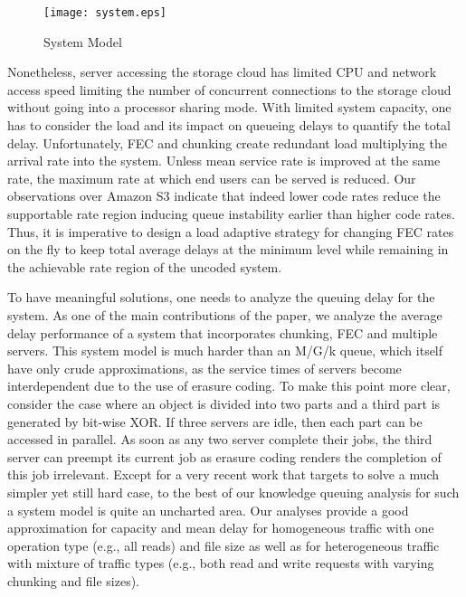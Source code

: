 \documentclass[journal]{IEEEtran}
\begin{document}
\begin{figure}[!t]
\centering
\texttt{[image: system.eps]}
\vspace{-20pt}
\caption{System Model}
\label{fig:system}
\vspace{-15pt}
\end{figure}

Nonetheless, server accessing the storage cloud has limited CPU and network access speed limiting the number of concurrent connections to the storage cloud without going into a processor sharing mode. With limited system capacity, one has to consider the load and its impact on queueing delays to quantify the total delay. Unfortunately, FEC and chunking create redundant load multiplying the arrival rate into the system. Unless mean service rate is improved at the same rate, the maximum rate at which end users can be served is reduced. Our observations over Amazon S3 indicate that indeed lower code rates reduce the supportable rate region inducing queue instability earlier than higher code rates. Thus, it is imperative to design a load adaptive strategy for changing FEC rates on the fly to keep total average delays at the minimum level while remaining in the achievable rate region of the uncoded system. 

To have meaningful solutions, one needs to analyze the queuing delay for the system. As one of the main contributions of the paper, we analyze the average delay performance of a system that incorporates chunking, FEC and multiple servers. This system model is much harder than an M/G/k queue, which itself have only crude approximations, as the service times of servers become interdependent due to the use of erasure coding. To make this point more clear, consider the case where an object is divided into two parts and a third part is generated by bit-wise XOR. If three servers are idle, then each part can be accessed in parallel. As soon as any two server complete their jobs, the third server can preempt its current job as erasure coding renders the completion of this job irrelevant. Except for a very recent work \cite{Longbocodeingincloud} that targets to solve a much simpler yet still hard case, to the best of our knowledge queuing analysis for such a system model is quite an uncharted area. Our analyses provide a good approximation for capacity and mean delay for homogeneous traffic with one operation type (e.g., all reads) and file size as well as for heterogeneous traffic with mixture of traffic types (e.g., both read and write requests with varying chunking and file sizes). 
\end{document}
